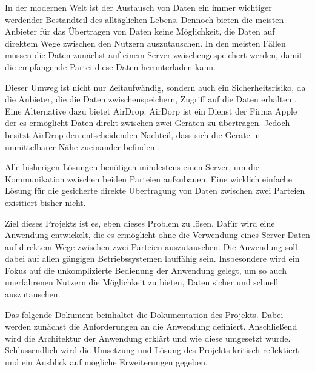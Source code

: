 In der modernen Welt ist der Austausch von Daten ein immer wichtiger werdender Bestandteil des alltäglichen Lebens. Dennoch bieten die meisten Anbieter für das Übertragen von Daten keine Möglichkeit, die Daten auf direktem Wege zwischen den Nutzern auszutauschen. In den meisten Fällen müssen die Daten zunächst auf einem Server zwischengespeichert werden, damit die empfangende Partei diese Daten herunterladen kann.

Dieser Umweg ist nicht nur Zeitaufwändig, sondern auch ein Sicherheitsrisiko, da die Anbieter, die die Daten zwischenspeichern, Zugriff auf die Daten erhalten \cite{bsi-cloud}. Eine Alternative dazu bietet AirDrop. AirDorp ist ein Dienst der Firma Apple der es ermöglicht Daten direkt zwischen zwei Geräten zu übertragen. Jedoch besitzt AirDrop den entscheidenden Nachteil, dass sich die Geräte in unmittelbarer Nähe zueinander befinden \cite{apple-airdrop}.

Alle bisherigen Lösungen benötigen mindestens einen Server, um die Kommunikation zwischen beiden Parteien aufzubauen. Eine wirklich einfache Lösung für die gesicherte direkte Übertragung von Daten zwischen zwei Parteien exisitiert bisher nicht.

Ziel dieses Projekts ist es, eben dieses Problem zu lösen. Dafür wird eine Anwendung entwickelt, die es ermöglicht ohne die Verwendung eines Server Daten auf direktem Wege zwischen zwei Parteien auszutauschen. Die Anwendung soll dabei auf allen gängigen Betriebssystemen lauffähig sein. Insbesondere wird ein Fokus auf die unkomplizierte Bedienung der Anwendung gelegt, um so auch unerfahrenen Nutzern die Möglichkeit zu bieten, Daten sicher und schnell auszutauschen.

Das folgende Dokument beinhaltet die Dokumentation des Projekts. Dabei werden zunächst die Anforderungen an die Anwendung definiert. Anschließend wird die Architektur der Anwendung erklärt und wie diese umgesetzt wurde. Schlussendlich wird die Umsetzung und Lösung des Projekts kritisch reflektiert und ein Ausblick auf mögliche Erweiterungen gegeben.